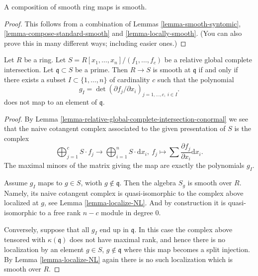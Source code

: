 \begin{lemma}
\label{lemma-compose-smooth}
A composition of smooth ring maps is smooth.
\end{lemma}

\begin{proof}
This follows from a combination of
Lemmas \ref{lemma-smooth-syntomic}, \ref{lemma-compose-standard-smooth}
and \ref{lemma-locally-smooth}.
(You can also prove this in many different ways; including easier
ones.)
\end{proof}

\begin{lemma}
\label{lemma-relative-global-complete-intersection-smooth}
Let $R$ be a ring. Let $S = R[x_1, \ldots, x_n]/(f_1, \ldots, f_c)$
be a relative global complete intersection.
Let $\mathfrak q \subset S$ be a prime. Then $R \to S$
is smooth at $\mathfrak q$ if and only if there exists a
subset $I \subset \{1, \ldots, n\}$ of cardinality $c$
such that the polynomial
$$
g_I = \det (\partial f_j/\partial x_i)_{j = 1, \ldots, c, \ i \in I}.
$$
does not map to an element of $\mathfrak q$.
\end{lemma}

\begin{proof}
By Lemma \ref{lemma-relative-global-complete-intersection-conormal}
we see that the naive cotangent complex
associated to the given presentation of $S$ is the complex
$$
\bigoplus\nolimits_{j = 1}^c S \cdot f_j
\longrightarrow
\bigoplus\nolimits_{i = 1}^n S \cdot \text{d}x_i, \ 
f_j \longmapsto \sum \frac{\partial f_j}{\partial x_i} \text{d}x_i.
$$
The maximal minors of the matrix giving the map are exactly
the polynomials $g_I$.

\medskip\noindent
Assume $g_I$ maps to $g \in S$, wioth $g \not \in \mathfrak q$.
Then the algebra $S_g$ is smooth over $R$. Namely, its naive
cotangent complex is quasi-isomorphic to the complex above
localized at $g$, see Lemma \ref{lemma-localize-NL}. And by
construction it is quasi-isomorphic to a free rank $n - c$
module in degree $0$.

\medskip\noindent
Conversely, suppose that all $g_I$ end up in $\mathfrak q$.
In this case the complex above tensored with $\kappa(\mathfrak q)$
does not have maximal rank, and hence there is no localization
by an element $g \in S$, $g \not \in \mathfrak q$
where this map becomes a split injection. By Lemma \ref{lemma-localize-NL}
again there is no such localization which is smooth over $R$.
\end{proof}

